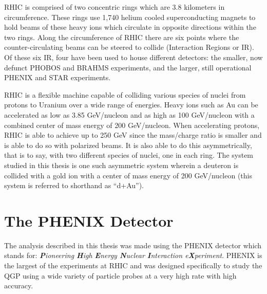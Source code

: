 RHIC is comprised of two concentric rings which are 3.8 kilometers in circumference.  These rings use 1,740 helium cooled superconducting magnets to hold beams of these heavy ions which circulate in opposite directions within the two rings.  Along the circumference of RHIC there are six points where the counter-circulating beams can be steered to collide (Interaction Regions or IR). Of these six IR, four have been used to house different detectors: the smaller, now defunct PHOBOS and BRAHMS experiments, and the larger, still operational PHENIX and STAR experiments.  

RHIC is a flexible machine capable of colliding various species of nuclei from protons to Uranium \citep{EBISupgrade} over a wide range of energies.  Heavy ions such as Au can be accelerated as low as 3.85 GeV/nucleon and as high as 100 GeV/nucleon \citep{RHIClum} with a combined center of mass energy of 200 GeV/nucleon.  When accelerating protons, RHIC is able to achieve up to 250 GeV since the mass/charge ratio is smaller and is able to do so with polarized beams. It is also able to do this asymmetrically, that is to say, with two different species of nuclei, one in each ring.  The system studied in this thesis is one such asymmetric system wherein a deuteron is collided with a gold ion with a center of mass energy of 200 GeV/nucleon (this system is referred to shorthand as ``d+Au'').

\section{The PHENIX Detector}

\indent The analysis described in this thesis was made using the PHENIX detector which stands for: \textit{\textbf{P}ioneering \textbf{H}igh \textbf{E}nergy \textbf{N}uclear \textbf{I}nteraction e\textbf{X}periment}. PHENIX is the largest of the experiments at RHIC and was designed specifically to study the QGP using a wide variety of particle probes at a very high rate with high accuracy.  

